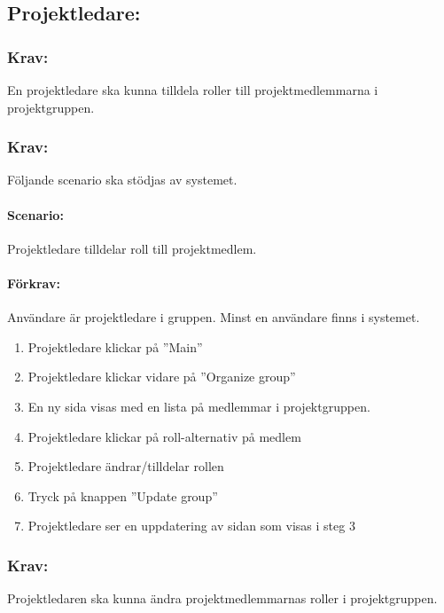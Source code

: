 \documentclass[paper=a4, fontsize=11pt,twoside]{article}
\begin{document}

\subsection{Projektledare:}

\subsubsection{Krav:} En projektledare ska kunna tilldela roller till projektmedlemmarna i projektgruppen.

\subsubsection{Krav:}
Följande scenario ska stödjas av systemet.
\paragraph{Scenario:}
Projektledare tilldelar roll till projektmedlem.
\paragraph{Förkrav:}
Användare är projektledare i gruppen. Minst en användare finns i systemet.
\begin{enumerate} 
\item Projektledare klickar på ”Main”
\item Projektledare klickar vidare på ”Organize group”
\item En ny sida visas med en lista på medlemmar i projektgruppen.
\item Projektledare klickar på roll-alternativ på medlem
\item Projektledare ändrar/tilldelar rollen
\item Tryck på knappen ”Update group”
\item Projektledare ser en uppdatering av sidan som visas i steg 3
\end{enumerate}

\subsubsection{Krav:}
Projektledaren ska kunna ändra projektmedlemmarnas roller i projektgruppen.
\end{document}

